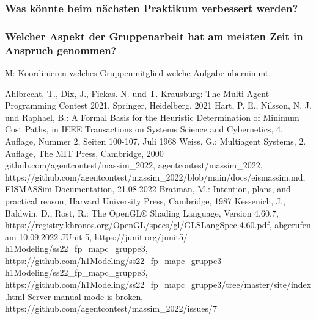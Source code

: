 \documentclass[runningheads]{llncs}
\begin{document}
\subsubsection{Was könnte beim nächsten Praktikum verbessert werden?\\}
\subsubsection{Welcher Aspekt der Gruppenarbeit hat am meisten Zeit in Anspruch genommen?\\}
M: Koordinieren welches Gruppenmitglied welche Aufgabe übernimmt.

%
%
%
% 
% 
%
\begin{thebibliography}{8}
	Ahlbrecht, T., Dix, J., Fiekas. N. und T. Krausburg: The Multi-Agent Programming Contest 2021, Springer, Heidelberg, 2021
	Hart, P. E., Nilsson, N. J. und Raphael, B.: A Formal Basis for the Heuristic Determination of Minimum Cost Paths, in IEEE Transactions on Systems Science and Cybernetics, 4. Auflage, Nummer 2, Seiten 100-107, Juli 1968
	Weiss, G.: Multiagent Systems, 2. Auflage, The MIT Press, Cambridge, 2000
	github.com/agentcontest/massim\_2022, agentcontest/massim\_2022, \\ https://github.com/agentcontest/massim\_2022/blob/main/docs/eismassim.md, EISMASSim Documentation, 21.08.2022
	Bratman, M.: Intention, plans, and practical reason, Harvard University Press, Cambridge, 1987
	Kessenich, J., Baldwin, D., Rost, R.: The OpenGL® Shading Language, Version 4.60.7, https://registry.khronos.org/OpenGL/specs/gl/GLSLangSpec.4.60.pdf, abgerufen am 10.09.2022
	JUnit 5, https://junit.org/junit5/
	h1Modeling/ss22\_fp\_mapc\_gruppe3, https://github.com/h1Modeling/ss22\_fp\_mapc\_gruppe3
	h1Modeling/ss22\_fp\_mapc\_gruppe3, \\ https://github.com/h1Modeling/ss22\_fp\_mapc\_gruppe3/tree/master/site/index.html
	Server manual mode is broken, https://github.com/agentcontest/massim\_2022/issues/7
	
\end{thebibliography}
\end{document}
